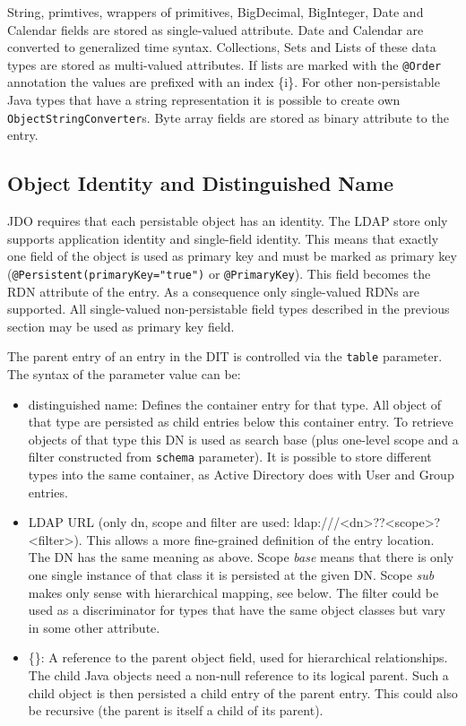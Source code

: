\documentclass[a4paper,11pt,oneside]{article}
\begin{document}
String, primtives, wrappers of primitives, BigDecimal, BigInteger, Date and Calendar fields are stored as single-valued attribute. Date and Calendar are converted to generalized time syntax. Collections, Sets and Lists of these data types are stored as multi-valued attributes. If lists are marked with the \texttt{@Order} annotation the values are prefixed with an index \{i\}. For other non-persistable Java types that have a string representation it is possible to create own \texttt{ObjectStringConverter}s. Byte array fields are stored as binary attribute to the entry.

\subsection{Object Identity and Distinguished Name}
JDO requires that each persistable object has an identity. The LDAP store only supports application identity and single-field identity. This means that exactly one field of the object is used as primary key and must be marked as primary key (\texttt{@Persistent(primaryKey="true")} or \texttt{@PrimaryKey}). This field becomes the RDN attribute of the entry. As a consequence only single-valued RDNs are supported. All single-valued non-persistable field types described in the previous section may be used as primary key field.

The parent entry of an entry in the DIT is controlled via the \texttt{table} parameter. The syntax of the parameter value can be: 
\begin{itemize}
\item distinguished name: Defines the container entry for that type. All object of that type are persisted as child entries below this container entry. To retrieve objects of that type this DN is used as search base (plus one-level scope and a filter constructed from \texttt{schema} parameter). It is possible to store different types into the same container, as Active Directory does with User and Group entries.
\item LDAP URL (only dn, scope and filter are used: ldap:///<dn>??<scope>?<filter>). This allows a more fine-grained definition of the entry location. The DN has the same meaning as above. Scope \textit{base} means that there is only one single instance of that class it is persisted at the given DN. Scope \textit{sub} makes only sense with hierarchical mapping, see below. The filter could be used as a discriminator for types that have the same object classes but vary in some other attribute.
\item \{<parent field name>\}: A reference to the parent object field, used for hierarchical relationships. The child Java objects need a non-null reference to its logical parent. Such a child object is then persisted a child entry of the parent entry. This could also be recursive (the parent is itself a child of its parent). 
\end{itemize}
\end{document}
